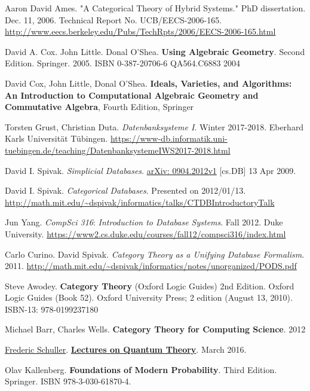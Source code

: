 Aaron David Ames. "A Categorical Theory of Hybrid Systems." PhD dissertation. Dec. 11, 2006. Technical Report No. UCB/EECS-2006-165. \url{http://www.eecs.berkeley.edu/Pubs/TechRpts/2006/EECS-2006-165.html}


David A. Cox.  John Little. Donal O'Shea. \textbf{Using Algebraic Geometry}.  Second Edition.  Springer.  2005.  ISBN 0-387-20706-6 QA564.C6883 2004

David Cox, John Little, Donal O'Shea. \textbf{Ideals, Varieties, and Algorithms: An Introduction to Computational Algebraic Geometry and Commutative Algebra}, Fourth Edition, Springer

Torsten Grust, Christian Duta. \emph{Datenbanksysteme I}. Winter 2017-2018. Eberhard Karls Universit\"{a}t T\"{u}bingen.  \url{https://www-db.informatik.uni-tuebingen.de/teaching/DatenbanksystemeIWS2017-2018.html}


David I. Spivak. \emph{Simplicial Databases}. \href{https://arxiv.org/abs/0904.2012}{arXiv: 0904.2012v1} [cs.DB] 13 Apr 2009.

David I. Spivak. \emph{Categorical Databases}. Presented on 2012/01/13. \url{http://math.mit.edu/~dspivak/informatics/talks/CTDBIntroductoryTalk}

Jun Yang. \emph{CompSci 316}: \emph{Introduction to Database Systems}. Fall 2012. Duke University. \url{https://www2.cs.duke.edu/courses/fall12/compsci316/index.html}

Carlo Curino. David Spivak. \emph{Category Theory as a Unifying Database Formalism}. 2011. \url{http://math.mit.edu/~dspivak/informatics/notes/unorganized/PODS.pdf}

Steve Awodey. \textbf{Category Theory} (Oxford Logic Guides) 2nd Edition. Oxford Logic Guides (Book 52). Oxford University Press; 2 edition (August 13, 2010). ISBN-13: 978-0199237180

Michael Barr, Charles Wells. \textbf{Category Theory for Computing Science}. 2012

\href{https://www.youtube.com/c/FredericSchuller}{Frederic Schuller}. \href{https://youtube.com/playlist?list=PLPH7f_7ZlzxQVx5jRjbfRGEzWY_upS5K6&si=rtLLBi4xcb-Z6bfH}{\textbf{Lectures on Quantum Theory}}. March 2016.

Olav Kallenberg. \textbf{Foundations of Modern Probability}. Third Edition. Springer. ISBN 978-3-030-61870-4.

